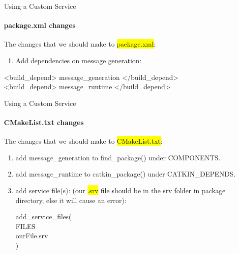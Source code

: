 \documentclass{beamer}
\begin{document}
\begin{frame}{Using a Custom Service}
    \framesubtitle{package.xml changes}

    The changes that we should make to {\ttfamily \colorbox{yellow}{package.xml}}:
    \begin{enumerate}
        \item Add dependencies on message generation:
    \end{enumerate}  
    \begin{focus}
        \ttfamily \scriptsize
        {\color{blue}<build\_depend>} message\_generation {\color{blue}</build\_depend>}\\
        
        {\color{blue}<build\_depend>} message\_runtime {\color{blue}</build\_depend>}\\
    \end{focus}         
\end{frame}

\begin{frame}{Using a Custom Service}
    \framesubtitle{CMakeList.txt changes}
    
    The changes that we should make to {\ttfamily \colorbox{yellow}{CMakeList.txt}}:
    \vspace{5mm}
    \scriptsize
    \begin{enumerate}
        \item add {\ttfamily \colorbox{gray!30!white}{message\_generation}} to {\ttfamily \colorbox{gray!30!white}{find\_package()}} under {\ttfamily \colorbox{gray!30!white}{COMPONENTS}}.
        \vspace{2mm}
        
        \item  add {\ttfamily \colorbox{gray!30!white}{message\_runtime}} to {\ttfamily \colorbox{gray!30!white}{catkin\_package()}} under {\ttfamily \colorbox{gray!30!white}{CATKIN\_DEPENDS}}.
        \vspace{2mm}
        
        \item add service file(s): (our {\ttfamily \colorbox{yellow}{.srv}} file should be in the {\ttfamily \colorbox{gray!30!white}{srv}} folder in package directory, else it will cause an error):
        \vspace{2mm}
        \begin{focus}
            \ttfamily \scriptsize
            add\_service\_files(\\
            FILES\\
            ourFile.srv\\
            )
          \end{focus}  
   \end{enumerate}
        
\end{frame}
\end{document}
